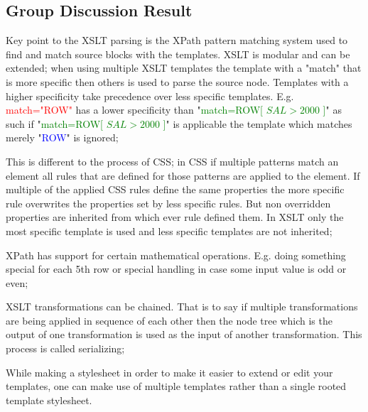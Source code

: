\subsection{Group Discussion Result}
	Key point to the XSLT parsing is the XPath pattern matching system used to find and match source blocks with the templates. XSLT is modular and can be extended; when using multiple XSLT templates the template with a "match" that is more specific then others is used to parse the source node. Templates with a higher specificity take precedence over less specific templates. E.g. \textcolor{red}{match="ROW"} has a lower specificity than "\textcolor{green}{match=ROW[ $SAL > 2000$ ]}" as such if "\textcolor{green}{match=ROW[ $SAL > 2000$ ]}" is applicable the template which matches merely "\textcolor{blue}{ROW}" is ignored;

	This is different to the process of CSS; in CSS if multiple patterns match an element all rules that are defined for those patterns are applied to the element. If multiple of the applied CSS rules define the same properties the more specific rule overwrites the properties set by less specific rules. But non overridden properties are inherited from which ever rule defined them. In XSLT only the most specific template is used and less specific templates are not inherited;
	
	XPath has support for certain mathematical operations. E.g. doing something special for each 5th row or special handling in case some input value is odd or even;
	
	XSLT transformations can be chained. That is to say if multiple transformations are being applied in sequence of each other then the node tree which is the output of one transformation is used as the input of another transformation. This process is called serializing;
	
	While making a stylesheet in order to make it easier to extend or edit your templates, one can make use of multiple templates rather than a single rooted template stylesheet.

%

